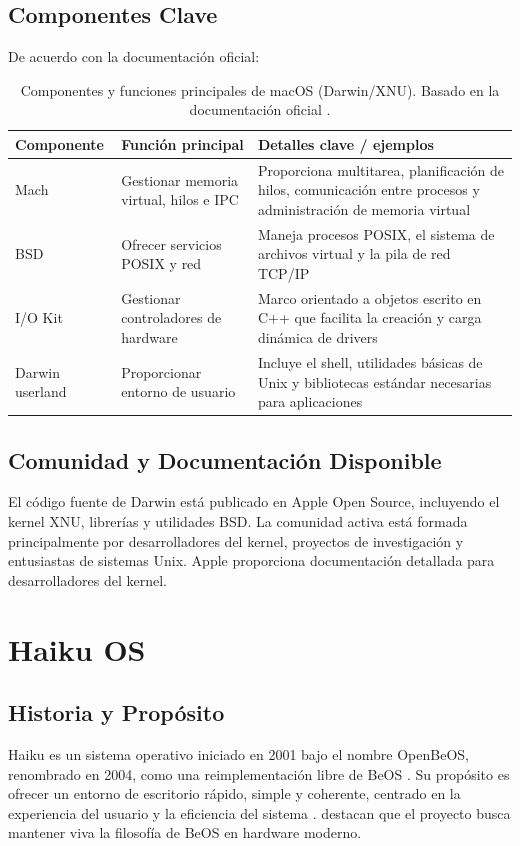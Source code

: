 \subsection{Componentes Clave}
De acuerdo con la documentación oficial:
\begin{table}[H]
\centering
\begin{tabular}{p{3.2cm}p{5cm}p{6cm}}
\hline
\textbf{Componente} & \textbf{Función principal} & \textbf{Detalles clave / ejemplos} \\
\hline
Mach & Gestionar memoria virtual, hilos e IPC & Proporciona multitarea, planificación de hilos, comunicación entre procesos y administración de memoria virtual \\
\hline
BSD & Ofrecer servicios POSIX y red & Maneja procesos POSIX, el sistema de archivos virtual y la pila de red TCP/IP \\
\hline
I/O Kit & Gestionar controladores de hardware & Marco orientado a objetos escrito en C++ que facilita la creación y carga dinámica de drivers \\
\hline
Darwin userland & Proporcionar entorno de usuario & Incluye el shell, utilidades básicas de Unix y bibliotecas estándar necesarias para aplicaciones \\
\hline
\end{tabular}
\caption[Componentes y funciones clave de macOS (Darwin/XNU)]{Componentes y funciones principales de macOS (Darwin/XNU). Basado en la documentación oficial \parencite{darwin_documentation}.}
\label{tab:componentes-macos}
\end{table}


\subsection{Comunidad y Documentación Disponible}
El código fuente de Darwin está publicado en Apple Open Source, 
incluyendo el kernel XNU, librerías y utilidades BSD.  
La comunidad activa está formada principalmente por desarrolladores del kernel, 
proyectos de investigación y entusiastas de sistemas Unix. Apple proporciona 
documentación detallada para desarrolladores del kernel.

\section{Haiku OS}

\subsection{Historia y Propósito}
Haiku es un sistema operativo iniciado en 2001 bajo el nombre OpenBeOS, 
renombrado en 2004, como una reimplementación libre de BeOS \parencite{haiku_official}.  
Su propósito es ofrecer un entorno de escritorio rápido, simple y coherente, 
centrado en la experiencia del usuario y la eficiencia del sistema \parencite{haiku_about}. 
\textcite{haiku_hackaday} destacan que el proyecto busca mantener viva la filosofía de BeOS en hardware moderno.

